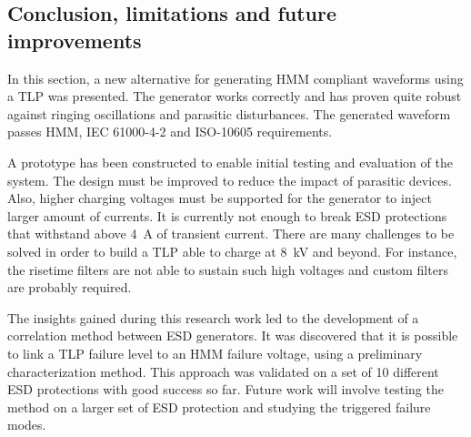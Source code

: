 \subsection{Conclusion, limitations and future improvements}

In this section, a new alternative for generating HMM compliant waveforms using a TLP was presented.
The generator works correctly and has proven quite robust against ringing oscillations and parasitic disturbances.
The generated waveform passes HMM, IEC 61000-4-2 and ISO-10605 requirements.

A prototype has been constructed to enable initial testing and evaluation of the system.
The design must be improved to reduce the impact of parasitic devices.
Also, higher charging voltages must be supported for the generator to inject larger amount of currents.
It is currently not enough to break ESD protections that withstand above \SI{4}{\ampere} of transient current.
There are many challenges to be solved in order to build a TLP able to charge at \SI{8}{\kilo\volt} and beyond.
For instance, the risetime filters are not able to sustain such high voltages and custom filters are probably required.

The insights gained during this research work led to the development of a correlation method between ESD generators.
It was discovered that it is possible to link a TLP failure level to an HMM failure voltage, using a preliminary characterization method.
This approach was validated on a set of 10 different ESD protections with good success so far.
Future work will involve testing the method on a larger set of ESD protection and studying the triggered failure modes.
